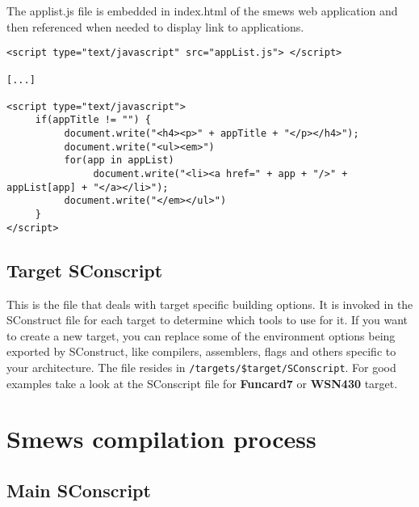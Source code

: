 \documentclass{report}
\begin{document}
The applist.js file is embedded in index.html of the smews web application and then referenced when needed to display link to applications.
\begin{verbatim}
<script type="text/javascript" src="appList.js"> </script>

[...]

<script type="text/javascript">
     if(appTitle != "") {
          document.write("<h4><p>" + appTitle + "</p></h4>");
          document.write("<ul><em>")
          for(app in appList)
               document.write("<li><a href=" + app + "/>" + appList[app] + "</a></li>");
          document.write("</em></ul>")
     }
</script>
\end{verbatim}

\subsection{Target SConscript} 
This is the file that deals with target specific building options. It is invoked in the SConstruct file for each target to determine which tools to use for it. If you want to create a new target, you can replace some of the environment options being exported by SConstruct, like compilers, assemblers, flags and others specific to your architecture. The file resides in \texttt{/targets/\$target/SConscript}. For good examples take a look at the SConscript file for \textbf{Funcard7} or \textbf{WSN430} target.

\section{Smews compilation process}

\subsection{Main SConscript}
\label{sub:preproc}
\end{document}
